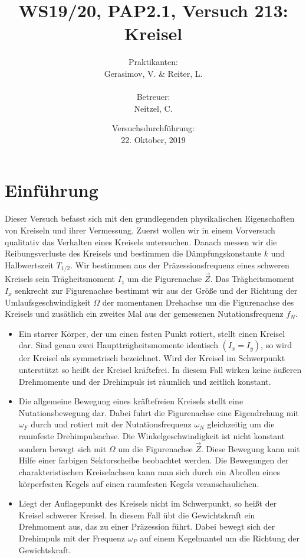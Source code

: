 \documentclass[a4paper,10pt]{article}
\title{WS19/20, PAP2.1, Versuch 213:\\ Kreisel}
\date{Versuchsdurchführung: \\22. Oktober, 2019}
\author{Praktikanten:\\Gerasimov, V. \& Reiter, L.\\\\ Betreuer:\\ Neitzel, C.}
\begin{document}
\maketitle

\newpage

\tableofcontents


\section[Einführung]{Einführung\fnrefb}\boldmath
Dieser Versuch befasst sich mit den grundlegenden physikalischen Eigenschaften von Kreiseln und ihrer Vermessung.
Zuerst wollen wir in einem Vorversuch qualitativ das Verhalten eines Kreisels untersuchen. Danach messen wir die Reibungsverluste des Kreisels und bestimmen die Dämpfungskonstante \(k\) und Halbwertszeit \(T_{1/2}\). Wir bestimmen aus der Präzessionsfrequenz eines schweren Kreisels sein
Trägheitsmoment \(I_{z}\) um die Figurenachse \(\vec{Z}\). Das Trägheitsmoment \(I_{x}\) senkrecht zur Figurenachse bestimmt wir aus der Größe und der Richtung der Umlaufsgeschwindigkeit  \(\Omega\) der momentanen Drehachse um die Figurenachse des Kreisels und zusätlich ein zweites Mal aus der gemessenen Nutationsfrequenz  \(f_{N}\).

\begin{itemize}
\item Ein starrer Körper, der um einen festen Punkt rotiert, stellt einen Kreisel dar. Sind genau zwei Hauptträgheitsmomente identisch \((I_{x}=I_{y})\), so wird der Kreisel als symmetrisch bezeichnet. Wird der Kreisel im Schwerpunkt unterstützt so heißt der Kreisel kräftefrei. In diesem Fall wirken keine äußeren Drehmomente und der Drehimpuls ist räumlich und zeitlich konstant.

\item Die allgemeine Bewegung eines kräftefreien Kreisels stellt eine Nutationsbewegung dar. Dabei fuhrt die Figurenachse eine Eigendrehung mit \(\omega_F\) durch und rotiert mit der Nutationsfrequenz \(\omega_N\) gleichzeitig um die raumfeste Drehimpulsachse. Die Winkelgeschwindigkeit ist nicht konstant sondern bewegt sich mit \(\Omega\) um die Figurenachse \(\vec{Z}\). Diese Bewegung kann mit Hilfe einer farbigen Sektorscheibe beobachtet werden. Die Bewegungen der charakteristischen Kreiselachsen kann man sich durch ein Abrollen eines körperfesten Kegels auf einen raumfesten Kegels veranschaulichen.

\item Liegt der Auflagepunkt des Kreisels nicht im Schwerpunkt, so heißt der Kreisel schwerer Kreisel. In diesem Fall übt die Gewichtskraft ein Drehmoment aus, das zu einer Präzession führt. Dabei bewegt sich der Drehimpuls mit der Frequenz  \(\omega_P\) auf einem Kegelmantel um die Richtung der Gewichtskraft.


\end{itemize}
\end{document}
